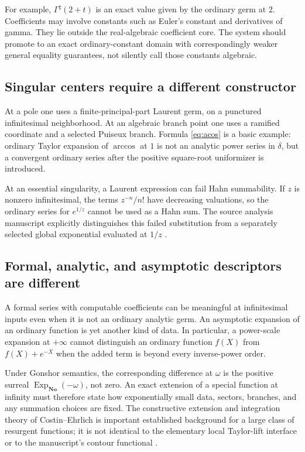 \documentclass[11pt,letterpaper]{article}
\theoremstyle{definition}
\newcommand{\No}{\mathbf{No}}
\newcommand{\ExpNo}{\operatorname{Exp}_{\No}}
\newcommand{\sh}{^{\sharp}}
\numberwithin{equation}{section}
\begin{document}
For example, $\Gamma\sh(2+t)$ is an exact value given by the ordinary germ at $2$. Coefficients may involve constants such as Euler's constant and derivatives of gamma. They lie outside the real-algebraic coefficient core. The system should promote to an exact ordinary-constant domain with correspondingly weaker general equality guarantees, not silently call those constants algebraic.

\subsection{Singular centers require a different constructor}
At a pole one uses a finite-principal-part Laurent germ, on a punctured infinitesimal neighborhood. At an algebraic branch point one uses a ramified coordinate and a selected Puiseux branch. Formula \eqref{eq:acos} is a basic example: ordinary Taylor expansion of $\arccos$ at $1$ is not an analytic power series in $\delta$, but a convergent ordinary series after the positive square-root uniformizer is introduced.

At an essential singularity, a Laurent expression can fail Hahn summability. If $z$ is nonzero infinitesimal, the terms $z^{-n}/n!$ have decreasing valuations, so the ordinary series for $e^{1/z}$ cannot be used as a Hahn sum. The source analysis manuscript explicitly distinguishes this failed substitution from a separately selected global exponential evaluated at $1/z$ \cite[``Essential singularities and a concrete summability boundary'']{SourceAnalysis}.

\subsection{Formal, analytic, and asymptotic descriptors are different}
A formal series with computable coefficients can be meaningful at infinitesimal inputs even when it is not an ordinary analytic germ. An asymptotic expansion of an ordinary function is yet another kind of data. In particular, a power-scale expansion at $+\infty$ cannot distinguish an ordinary function $f(X)$ from $f(X)+e^{-X}$ when the added term is beyond every inverse-power order.

Under Gonshor semantics, the corresponding difference at $\omega$ is the positive surreal $\ExpNo(-\omega)$, not zero. An exact extension of a special function at infinity must therefore state how exponentially small data, sectors, branches, and any summation choices are fixed. The constructive extension and integration theory of Costin--Ehrlich is important established background for a large class of resurgent functions; it is not identical to the elementary local Taylor-lift interface or to the manuscript's contour functional \cite{CostinEhrlich}.
\end{document}
